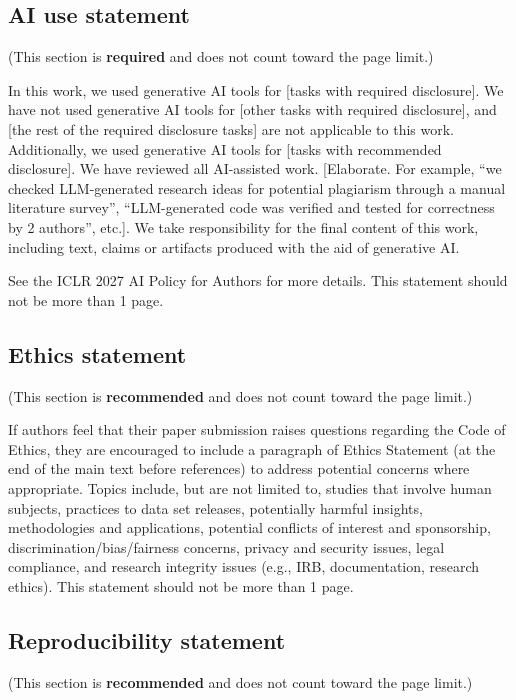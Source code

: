 
\subsection*{AI use statement}

(This section is \textbf{required} and does not count toward the page limit.)

In this work, we used generative AI tools for [tasks with required disclosure].
We have not used generative AI tools for [other tasks with required disclosure],
and [the rest of the required disclosure tasks] are not applicable to this work.
Additionally, we used generative AI tools for [tasks with recommended
disclosure]. We have reviewed all AI-assisted work. [Elaborate. For example, “we
checked LLM-generated research ideas for potential plagiarism through a manual
literature survey”, “LLM-generated code was verified and tested for correctness
by 2 authors”, etc.]. We take responsibility for the final content of this work,
including text, claims or artifacts produced with the aid of generative AI.

See the ICLR 2027 AI Policy for Authors for more details. This statement should
not be more than 1 page.

\subsection*{Ethics statement}

(This section is \textbf{recommended} and does not count toward the page limit.)

If authors feel that their paper submission raises questions regarding the Code
of Ethics, they are encouraged to include a paragraph of Ethics Statement (at
the end of the main text before references) to address potential concerns where
appropriate. Topics include, but are not limited to, studies that involve human
subjects, practices to data set releases, potentially harmful insights,
methodologies and applications, potential conflicts of interest and sponsorship,
discrimination/bias/fairness concerns, privacy and security issues, legal
compliance, and research integrity issues (e.g., IRB, documentation, research
ethics). This statement should not be more than 1 page.

\subsection*{Reproducibility statement}

(This section is \textbf{recommended} and does not count toward the page limit.)

